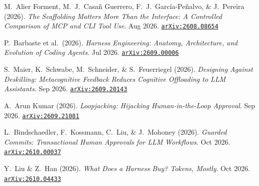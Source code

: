 \documentclass[10pt,letterpaper]{article}
\newcommand{\code}[1]{\texttt{\color{InkNavy}#1}}
\newcommand{\arxiv}[1]{\href{https://arxiv.org/abs/#1}{\code{arXiv:#1}}}
\begin{document}
\begin{enumerate}[label={[\arabic*]}, leftmargin=2.2em, itemsep=1.1pt, start=17]
  \item M.\ Alier Forment, M.\ J.\ Casa\~{n} Guerrero, F.\ J.\ Garc\'{i}a-Pe\~{n}alvo, \& J.\ Pereira (2026). \emph{The Scaffolding Matters More Than the Interface: A Controlled Comparison of MCP and CLI Tool Use}. Aug 2026. \arxiv{2608.08654}
  \item P.\ Barbaste et al.\ (2026). \emph{Harness Engineering: Anatomy, Architecture, and Evolution of Coding Agents}. Jul 2026. \arxiv{2609.00006}
  \item S.\ Maier, K.\ Schwabe, M.\ Schneider, \& S.\ Feuerriegel (2026). \emph{Designing Against Deskilling: Metacognitive Feedback Reduces Cognitive Offloading to LLM Assistants}. Sep 2026. \arxiv{2609.20143}
  \item A.\ Arun Kumar (2026). \emph{Loopjacking: Hijacking Human-in-the-Loop Approval}. Sep 2026. \arxiv{2609.21081}
  \item L.\ Bindschaedler, F.\ Kossmann, C.\ Liu, \& J.\ Mohoney (2026). \emph{Guarded Commits: Transactional Human Approvals for LLM Workflows}. Oct 2026. \arxiv{2610.00037}
  \item Y.\ Liu \& Z.\ Han (2026). \emph{What Does a Harness Buy? Tokens, Mostly}. Oct 2026. \arxiv{2610.04433}
\end{enumerate}
\end{document}

